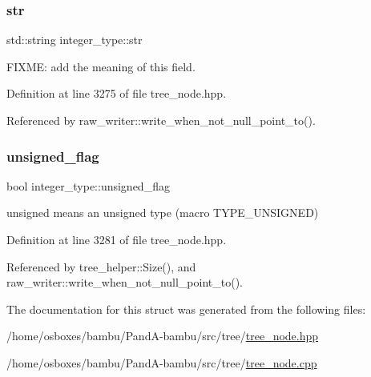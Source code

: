 \mbox{\label{structinteger__type_a734d8c7ea62046a0bb29a0c162aeb5dd}} 
\subsubsection{\texorpdfstring{str}{str}}
{\footnotesize\ttfamily std\+::string integer\+\_\+type\+::str}



F\+I\+X\+ME\+: add the meaning of this field. 



Definition at line 3275 of file tree\+\_\+node.\+hpp.



Referenced by raw\+\_\+writer\+::write\+\_\+when\+\_\+not\+\_\+null\+\_\+point\+\_\+to().

\mbox{\label{structinteger__type_afa53c2ecd072946b7a3eb8c3db186297}} 
\subsubsection{\texorpdfstring{unsigned\+\_\+flag}{unsigned\_flag}}
{\footnotesize\ttfamily bool integer\+\_\+type\+::unsigned\+\_\+flag}



unsigned means an unsigned type (macro T\+Y\+P\+E\+\_\+\+U\+N\+S\+I\+G\+N\+ED) 



Definition at line 3281 of file tree\+\_\+node.\+hpp.



Referenced by tree\+\_\+helper\+::\+Size(), and raw\+\_\+writer\+::write\+\_\+when\+\_\+not\+\_\+null\+\_\+point\+\_\+to().



The documentation for this struct was generated from the following files\+:\begin{DoxyCompactItemize}
\item 
/home/osboxes/bambu/\+Pand\+A-\/bambu/src/tree/\hyperlink{tree__node_8hpp}{tree\+\_\+node.\+hpp}\item 
/home/osboxes/bambu/\+Pand\+A-\/bambu/src/tree/\hyperlink{tree__node_8cpp}{tree\+\_\+node.\+cpp}\end{DoxyCompactItemize}
